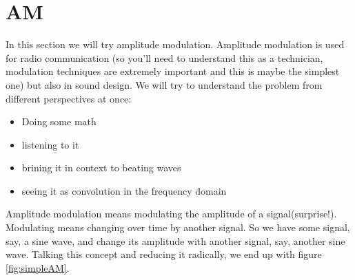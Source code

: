 













\section{AM} %
\label{sub:AM}
In this section we will try amplitude modulation. Amplitude modulation is used for radio communication (so you'll need to understand this as a technician, modulation techniques are extremely important and this is maybe the simplest one) but also in sound design. We will try to understand the problem from different perspectives at once:
\begin{itemize}
	\item Doing some math
	\item listening to it
	\item brining it in context to beating waves
	\item seeing it as convolution in the frequency domain
\end{itemize}

Amplitude modulation means modulating the amplitude of a signal(surprise!). Modulating means changing over time by another signal. So we have some signal, say, a sine wave, and change its amplitude with another signal, say, another sine wave. Talking this concept and reducing it radically, we end up with figure \ref{fig:simpleAM}. 

